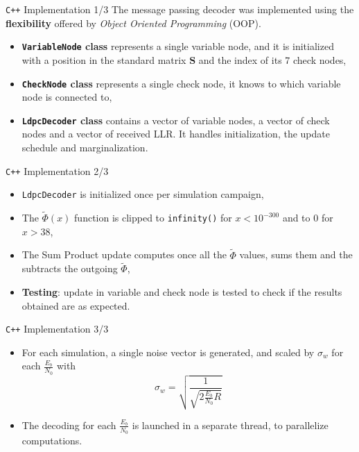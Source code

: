 \documentclass[pdf]
          {beamer}
\begin{document}
\begin{frame}{\texttt{C++} Implementation 1/3}
	The message passing decoder was implemented using the \textbf{flexibility} offered by \textit{Object Oriented Programming} (OOP). 
	\begin{itemize}
		\item \textbf{\texttt{VariableNode} class} represents a single variable node, and it is initialized with a position in the standard matrix $\mathbf{S}$ and the index of its 7 check nodes,
		\item \textbf{\texttt{CheckNode} class} represents a single check node, it knows to which variable node is connected to,
		\item \textbf{\texttt{LdpcDecoder} class} contains a vector of variable nodes, a vector of check nodes and a vector of received LLR. It handles initialization, the update schedule and marginalization.
	\end{itemize}
\end{frame}

\begin{frame}{\texttt{C++} Implementation 2/3} 
	\begin{itemize}
		\item \texttt{LdpcDecoder} is initialized once per simulation campaign,
		\item The $\tilde{\Phi}(x)$ function is clipped to \texttt{infinity()} for $x < 10^{-300}$ and to 0 for $x > 38$,
		\item The Sum Product update computes once all the $\tilde{\Phi}$ values, sums them and the subtracts the outgoing $\tilde{\Phi}$,
		\item \textbf{Testing}: update in variable and check node is tested to check if the results obtained are as expected.
	\end{itemize}
\end{frame}

\begin{frame}{\texttt{C++} Implementation 3/3} 
	\begin{itemize}
		\item For each simulation, a single noise vector is generated, and scaled by $\sigma_w$ for each $\frac{E_b}{N_0}$ with
		$$
			\sigma_w = \sqrt{\frac{1}{\sqrt{2 \frac{E_b}{N_0} R}}}
		$$
		\item The decoding for each $\frac{E_b}{N_0}$ is launched in a separate thread, to parallelize computations.
	\end{itemize}
\end{frame}
\end{document}
